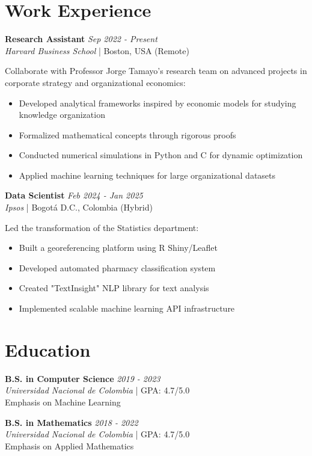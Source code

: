 \documentclass[a4paper,10pt]{article}
\newcommand{\dateitem}[1]{
    \small\textcolor{secondary}{\textit{#1}}
}
\newcommand{\workposition}[4]{
    \textbf{#1} \hfill \dateitem{#2}\\
    \textit{#3} | #4\\[0.3em]
}
\begin{document}
\begin{minipage}[t]{0.63\textwidth}\vspace{0pt}
    \section{Work Experience}
    \workposition{Research Assistant}{Sep 2022 - Present}{Harvard Business School}{Boston, USA (Remote)}
    \small{
    Collaborate with Professor Jorge Tamayo's research team on advanced projects in corporate strategy and organizational economics:
    \begin{itemize}
        \item Developed analytical frameworks inspired by economic models for studying knowledge organization
        \item Formalized mathematical concepts through rigorous proofs
        \item Conducted numerical simulations in Python and C for dynamic optimization
        \item Applied machine learning techniques for large organizational datasets
    \end{itemize}
    }
    
    \vspace{0.2cm} %
    
    \workposition{Data Scientist}{Feb 2024 - Jan 2025}{Ipsos}{Bogotá D.C., Colombia (Hybrid)}
    \small{
    Led the transformation of the Statistics department:
    \begin{itemize}
        \item Built a georeferencing platform using R Shiny/Leaflet
        \item Developed automated pharmacy classification system
        \item Created "TextInsight" NLP library for text analysis
        \item Implemented scalable machine learning API infrastructure
    \end{itemize}
    }

    \section{Education}
    \workposition{B.S. in Computer Science}{2019 - 2023}{Universidad Nacional de Colombia}{GPA: 4.7/5.0}
    \small{Emphasis on Machine Learning}
    
    \vspace{0.2cm} %
    
    \workposition{B.S. in Mathematics}{2018 - 2022}{Universidad Nacional de Colombia}{GPA: 4.7/5.0}
    \small{Emphasis on Applied Mathematics}
\end{minipage}
\end{document}
